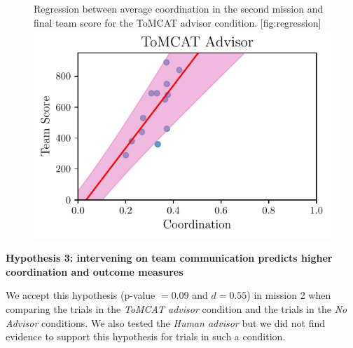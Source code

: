 \begin{figure}[h]
	\centering
    \begin{sidecaption}{%
        Regression between average coordination in the second mission and final
        team score for the ToMCAT advisor condition.
    }[fig:regression]
    \includegraphics{figures/tomcat_score_slope.pdf}
\end{sidecaption}
\end{figure}


\textbf{Hypothesis 3: intervening on team communication predicts higher
coordination and outcome measures}

We accept this hypothesis (p-value $= 0.09$ and $d = 0.55$) in mission 2 when
comparing the trials in the \emph{ToMCAT advisor} condition and the trials in
the \emph{No Advisor} conditions. We also tested the \emph{Human advisor} but
we did not find evidence to support this hypothesis for trials in such a
condition.
